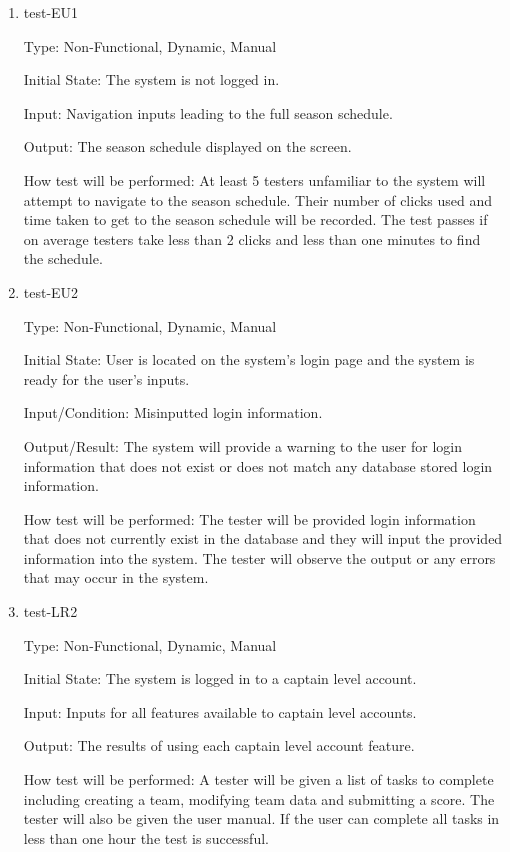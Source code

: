 \documentclass[12pt, titlepage]{article}
\begin{document}
\begin{enumerate}

  \item{test-EU1\\}

  Type: Non-Functional, Dynamic, Manual

  Initial State: The system is not logged in.

  Input: Navigation inputs leading to the full season schedule.

  Output: The season schedule displayed on the screen.

  How test will be performed: At least 5 testers unfamiliar to the system will
  attempt to navigate to the season schedule. Their number of clicks used and
  time taken to get to the season schedule will be recorded. The test passes
  if on average testers take less than 2 clicks and less than one minutes to
  find the schedule.

  \item{test-EU2\\}
  
  Type: Non-Functional, Dynamic, Manual
            
  Initial State: User is located on the system's login page and the system is ready
  for the user's inputs.
            
  Input/Condition: Misinputted login information.
            
  Output/Result: The system will provide a warning to the user for login information that
  does not exist or does not match any database stored login information.
            
  How test will be performed: The tester will be provided login information that does not
  currently exist in the database and they will input the provided information into the
  system. The tester will observe the output or any errors that may occur in the system.

  \item{test-LR2\\}

  Type: Non-Functional, Dynamic, Manual

  Initial State: The system is logged in to a captain level account.

  Input: Inputs for all features available to captain level accounts.

  Output: The results of using each captain level account feature.

  How test will be performed: A tester will be given a list of tasks to
  complete including creating a team, modifying team data and submitting a
  score. The tester will also be given the user manual. If the user can
  complete all tasks in less than one hour the test is successful.
            

\end{enumerate}
\end{document}
